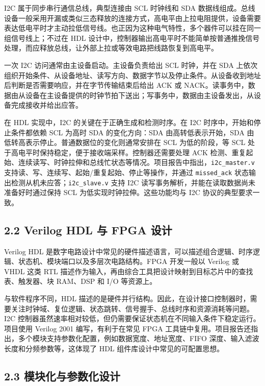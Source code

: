 I2C 属于同步串行通信总线，典型连接由 SCL 时钟线和 SDA 数据线组成。总线设备一般采用开漏或类似三态释放的连接方式，高电平由上拉电阻提供，设备需要表达低电平时才主动拉低信号线。也正因为这种电气特性，多个器件可以挂在同一组信号线上；不过在 HDL 设计中，控制器输出高电平时不能简单按普通推挽信号处理，而应释放总线，让外部上拉或等效电路把线路恢复到高电平。

一次 I2C 访问通常由主设备启动。主设备负责给出 SCL 时钟，并在 SDA 上依次组织开始条件、从设备地址、读写方向、数据字节以及停止条件。从设备收到地址后判断是否需要响应，并在字节传输结束后给出 ACK 或 NACK。读事务中，数据由从设备在主设备提供的时钟节拍下送出；写事务中，数据由主设备发出，从设备完成接收并给出应答。

在 HDL 实现中，I2C 的关键在于正确生成和检测时序。在 I2C 时序中，开始和停止条件都依赖 SCL 为高时 SDA 的变化方向：SDA 由高转低表示开始，SDA 由低转高表示停止。普通数据位的变化则通常安排在 SCL 为低的阶段，等 SCL 处于高电平时保持稳定，便于接收端采样。控制器还需要处理 ACK 检测、重复起始、连续读写、时钟拉伸和总线忙状态等情况。项目报告中指出，\texttt{i2c\_master.v} 支持读、写、连续写、起始/重复起始、停止等操作，并通过 \texttt{missed\_ack} 状态输出检测从机未应答；\texttt{i2c\_slave.v} 支持 I2C 读写事务解析，并能在读取数据尚未准备好时通过保持 SCL 为低实现时钟拉伸。这些功能均与 I2C 协议的典型要求一致。

\subsection{2.2 Verilog HDL 与 FPGA 设计}\label{verilog-hdl-ux4e0e-fpga-ux8bbeux8ba1}

Verilog HDL 是数字电路设计中常见的硬件描述语言，可以描述组合逻辑、时序逻辑、状态机、模块端口以及多层次电路结构。FPGA 开发一般以 Verilog 或 VHDL 这类 RTL 描述作为输入，再由综合工具把设计映射到目标芯片中的查找表、触发器、块 RAM、DSP 和 I/O 等资源上。

与软件程序不同，HDL 描述的是硬件并行结构。因此，在设计接口控制器时，需要关注时钟域、复位逻辑、状态跳转、信号握手、总线时序和资源消耗等问题。I2C 控制器虽然速率相对较低，但仍需要保证状态机在不同输入条件下稳定运行。项目使用 Verilog 2001 编写，有利于在常见 FPGA 工具链中复用。项目报告还指出，多个模块支持参数化配置，例如数据宽度、地址宽度、FIFO 深度、输入滤波长度和分频参数等，这体现了 HDL 组件库设计中常见的可配置思想。

\subsection{2.3 模块化与参数化设计}\label{ux6a21ux5757ux5316ux4e0eux53c2ux6570ux5316ux8bbeux8ba1}


